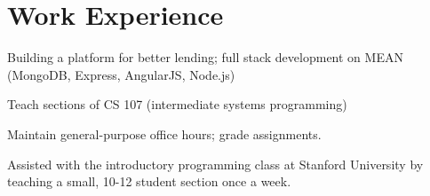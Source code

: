 \documentclass[letterpaper]{deedy-resume} %
\begin{document}
\hfill
%
%
\begin{minipage}[t]{0.66\textwidth} %


\section{Work Experience}


\vspace{\topsep} %
\begin{tightitemize}
\item Building a platform for better lending; full stack development on MEAN (MongoDB, Express, AngularJS, Node.js)
\end{tightitemize}

\sectionspace %

\begin{tightitemize}
\item Teach sections of CS 107 (intermediate systems programming)
\item Maintain general-purpose office hours; grade assignments.
\end{tightitemize}

\sectionspace %

\begin{tightitemize}
\item Assisted with the introductory programming class at Stanford University by teaching a small, 10-12 student section once a week.
\end{tightitemize}


\end{minipage}
\end{document}
